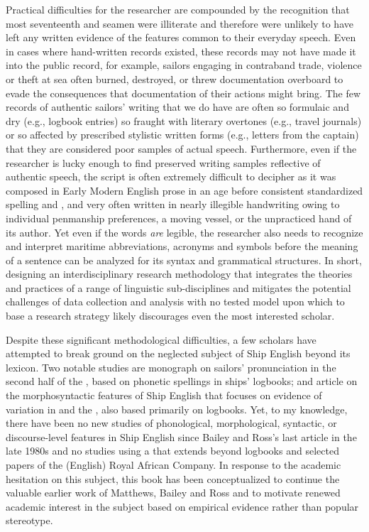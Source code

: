 Practical difficulties for the researcher are compounded by the recognition that most seventeenth and  seamen were illiterate \citep[167]{Kelly2006} and therefore were unlikely to have left any written evidence of the features common to their everyday speech. Even in cases where hand-written records existed, these records may not have made it into the public record, for example, sailors engaging in contraband trade, violence or theft at sea often burned, destroyed, or threw documentation overboard to evade the consequences that documentation of their actions might bring. The few records of authentic sailors’ writing that we do have are often so formulaic and dry (e.g., logbook entries) so fraught with literary overtones (e.g., travel journals) or so affected by prescribed stylistic written forms (e.g., letters from the captain) that they are considered poor samples of actual speech. Furthermore, even if the researcher is lucky enough to find preserved writing samples reflective of authentic speech, the script is often extremely difficult to decipher as it was composed in Early Modern English prose in an age before consistent standardized spelling and , and very often written in nearly illegible handwriting owing to individual penmanship preferences, a moving vessel, or the unpracticed hand of its author. Yet even if the words \textit{are} legible, the researcher also needs to recognize and interpret maritime abbreviations, acronyms and symbols before the meaning of a sentence can be analyzed for its syntax and grammatical structures. In short, designing an interdisciplinary research methodology that integrates the theories and practices of a range of linguistic sub-disciplines and mitigates the potential challenges of data collection and analysis with no tested model upon which to base a research strategy likely discourages even the most interested scholar. 



Despite these significant methodological difficulties, a few scholars have attempted to break ground on the neglected subject of Ship English beyond its lexicon. Two notable studies are  monograph on sailors’ pronunciation in the second half of the , based on phonetic spellings in ships’ logbooks; and  article on the morphosyntactic features of Ship English that focuses on evidence of variation in  and the , also based primarily on logbooks. Yet, to my knowledge, there have been no new studies of phonological, morphological, syntactic, or discourse-level features in Ship English since Bailey and Ross’s last article in the late 1980s and no studies using a  that extends beyond logbooks and selected papers of the (English) Royal African Company. In response to the academic hesitation on this subject, this book has been conceptualized to continue the valuable earlier work of Matthews, Bailey and Ross and to motivate renewed academic interest in the subject based on empirical evidence rather than popular stereotype.  



